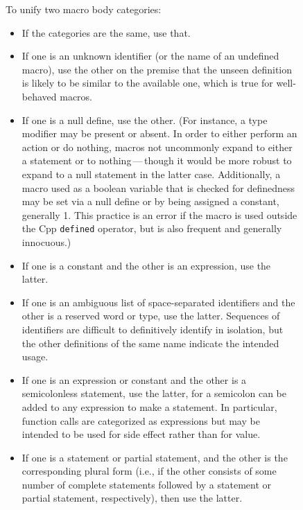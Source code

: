 \documentclass[10pt]{article}
\begin{document}
\begin{figure}
\small

\noindent
To unify two macro body categories:

\begin{itemize}\itemsep 0pt \parskip 0pt

\item If the categories are the same, use that.

\item If one is an unknown identifier (or the name of an undefined macro), use
  the other on the premise that the unseen definition is likely to be
  similar to the available one, which is true for well-behaved macros.

\item If one is a null define, use the other.  
  (For instance, a type modifier may be present or absent.  In order to
  either perform an action or do nothing, macros not uncommonly expand to
  either a statement or to nothing\,---\,though it would be more robust to
  expand to a null statement in the latter case.  Additionally, a macro
  used as a boolean variable that is checked for definedness may be set
  via a null define or by being assigned a constant, generally 1.  This
  practice is an error if the macro is used outside the Cpp {\tt defined}
  operator, but is also frequent and generally innocuous.)

\item If one is a constant and the other is an expression, use the latter.

\item If one is an ambiguous list of space-separated identifiers and the other
  is a reserved word or type, use the latter.  Sequences of identifiers are
  difficult to definitively identify in isolation, but the other
  definitions of the same name indicate the intended usage.

\item If one is an expression or constant and the other is a semicolonless
  statement, use the latter, for a semicolon can be added to any expression
  to make a statement.  In particular, function calls are categorized as
  expressions but may be intended to be used for side effect rather than
  for value.

\item
  If one is a statement or partial statement, and the other is the
  corresponding plural form (i.e., if the other consists of some number of
  complete statements followed by a statement or partial statement,
  respectively), then use the latter.


\end{itemize}
\end{figure}
\end{document}
